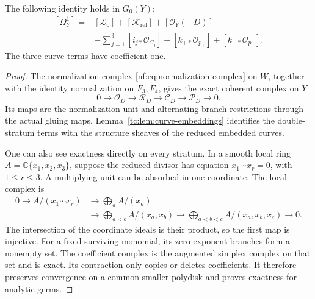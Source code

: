 \begin{proposition}\label{tc:prop:coherent-cotangent}
The following identity holds in $G_0(Y)$:
\begin{equation}\label{tc:eq:coherent-cotangent}
 \begin{aligned}
 [\Omega_Y^1]
   ={}&[\mathcal L_0]+[\mathcal K_{\mathrm{rel}}]
                         +[\mathcal O_Y(-D)]\\
      &-\sum_{j=1}^3[i_{j*}\mathcal O_{C_j}]
                         +[k_{+*}\mathcal O_{p_+}]
                         +[k_{-*}\mathcal O_{p_-}].
 \end{aligned}
\end{equation}
The three curve terms have coefficient one.
\end{proposition}

\begin{proof}
The normalization complex \eqref{nf:eq:normalization-complex}
on $W$, together with the identity normalization on $F_3,F_4$,
gives the exact coherent complex on $Y$
\begin{equation}\label{tc:eq:conductor-complex}
 0\longrightarrow\mathcal O_D
 \longrightarrow\mathcal R_D
 \longrightarrow\mathcal C_D
 \longrightarrow\mathcal P_D\longrightarrow0.
\end{equation}
Its maps are the normalization unit and alternating branch
restrictions through the actual gluing maps.
Lemma~\ref{tc:lem:curve-embeddings} identifies the double-stratum
terms with the structure sheaves of the reduced embedded curves.

One can also see exactness directly on every stratum.
In a smooth local ring $A=\mathbb C\{x_1,x_2,x_3\}$, suppose
the reduced divisor has equation $x_1\cdots x_r=0$, with
$1\le r\le3$. A multiplying unit can be absorbed in one coordinate.
The local complex is
\begin{equation}\label{tc:eq:local-conductor}
 \begin{aligned}
 0\longrightarrow A/(x_1\cdots x_r)
  &\longrightarrow\bigoplus_a A/(x_a)\\
  &\longrightarrow\bigoplus_{a<b}A/(x_a,x_b)
   \longrightarrow\bigoplus_{a<b<c}A/(x_a,x_b,x_c)
   \longrightarrow0.
 \end{aligned}
\end{equation}
The intersection of the coordinate ideals is their product, so
the first map is injective. For a fixed surviving monomial,
its zero-exponent branches form a nonempty set.
The coefficient complex is the augmented simplex complex on
that set and is exact. Its contraction only copies or deletes
coefficients. It therefore preserves convergence on a common
smaller polydisk and proves exactness for analytic germs.


\end{proof}
